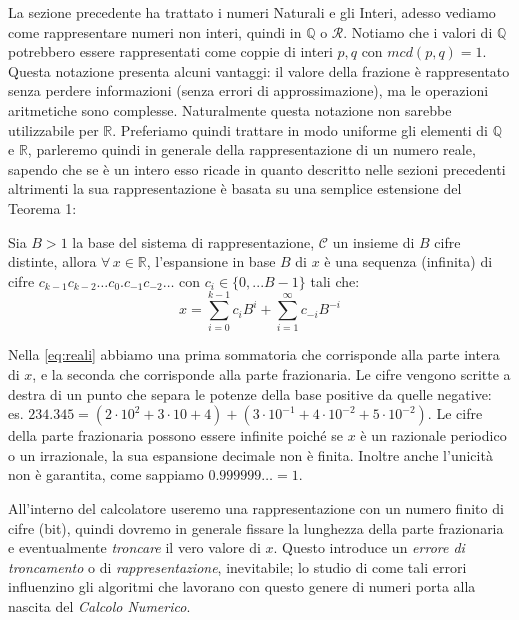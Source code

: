 La sezione precedente ha trattato i numeri Naturali e gli Interi, adesso
vediamo come rappresentare numeri non interi, quindi in $\mathbb{Q}$ o
$\mathcal{R}$. Notiamo che i valori di $\mathbb{Q}$ potrebbero essere
rappresentati come coppie di interi $p, q$ con $mcd(p,q) = 1$. Questa notazione
presenta alcuni vantaggi: il valore della frazione è rappresentato senza
perdere informazioni (senza errori di approssimazione), ma le operazioni
aritmetiche sono complesse. Naturalmente questa notazione non sarebbe
utilizzabile per $\mathbb{R}$. Preferiamo quindi trattare in modo uniforme gli
elementi di $\mathbb{Q}$ e $\mathbb{R}$, parleremo quindi in generale della
rappresentazione di un numero reale, sapendo che se è un intero esso ricade in
quanto descritto nelle sezioni precedenti altrimenti la sua rappresentazione è
basata su una semplice estensione del Teorema 1:

\begin{thm}
\label{thm:F}
Sia $B>1$ la base del sistema di rappresentazione, $\mathcal{C}$ un insieme
di $B$ cifre distinte, allora $\forall\, x \in \mathbb{R}$, l'espansione in base $B$ di $x$ è una sequenza (infinita) di cifre $c_{k-1}c_{k-2}{\ldots}c_0.c_{-1}c_{-2}\ldots$ con $c_i \in \{0,...B-1\}$ tali che:
\begin{equation}\label{eq:reali}
	x = \sum_{i=0}^{k-1} c_iB^i + \sum_{i=1}^{\infty} c_{-i}B^{-i}
\end{equation}
\end{thm}

Nella \eqref{eq:reali} abbiamo una prima sommatoria che corrisponde alla parte
intera di $x$, e la seconda che corrisponde alla parte frazionaria. Le cifre
vengono scritte a destra di un punto che separa le potenze della base positive
da quelle negative: es. $234.345 =
(2\cdot10^2+3\cdot10+4)+(3\cdot10^{-1}+4\cdot10^{-2}+5\cdot10^{-2})$. Le cifre
della parte frazionaria possono essere infinite poiché se $x$ è un razionale
periodico o un irrazionale, la sua espansione decimale non è finita. Inoltre
anche l'unicità non è garantita, come sappiamo $0.999999\ldots = 1$.

All'interno del calcolatore useremo una rappresentazione con un numero finito
di cifre (bit), quindi dovremo in generale fissare la lunghezza della parte
frazionaria e eventualmente \emph{troncare} il vero valore di $x$. Questo
introduce un \emph{errore di troncamento} o di \emph{rappresentazione},
inevitabile; lo studio di come tali errori influenzino gli algoritmi che
lavorano con questo genere di numeri porta alla nascita del \emph{Calcolo
Numerico}.

